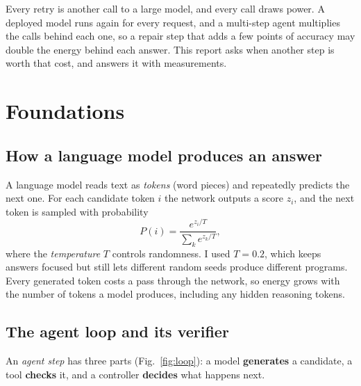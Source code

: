 \documentclass[11pt,a4paper]{article}
\begin{document}
Every retry is another call to a large model, and every call draws power. A deployed model runs again for every request, and a multi-step agent multiplies the calls behind each one, so a repair step that adds a few points of accuracy may double the energy behind each answer. This report asks when another step is worth that cost, and answers it with measurements.

\section{Foundations}
\subsection{How a language model produces an answer}
A language model reads text as \emph{tokens} (word pieces) and repeatedly predicts the next one. For each candidate token $i$ the network outputs a score $z_i$, and the next token is sampled with probability
\begin{equation}
P(i)=\frac{e^{z_i/T}}{\sum_k e^{z_k/T}},
\end{equation}
where the \emph{temperature} $T$ controls randomness. I used $T=0.2$, which keeps answers focused but still lets different random seeds produce different programs. Every generated token costs a pass through the network, so energy grows with the number of tokens a model produces, including any hidden reasoning tokens.

\subsection{The agent loop and its verifier}
An \emph{agent step} has three parts (Fig.~\ref{fig:loop}): a model \textbf{generates} a candidate, a tool \textbf{checks} it, and a controller \textbf{decides} what happens next.
\end{document}
